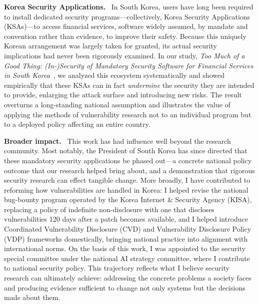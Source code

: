 \documentclass[10pt,letterpaper]{article}
\newcommand{\PP}[1]{\par\smallskip\noindent\textbf{#1.}\ }
\begin{document}
\PP{Korea Security Applications} In South Korea, users have long been required to
install dedicated security programs---collectively, Korea Security Applications
(KSAs)---to access financial services, software widely assumed, by mandate and
convention rather than evidence, to improve their safety. Because this uniquely
Korean arrangement was largely taken for granted, its actual security
implications had never been rigorously examined. In our study, \emph{Too Much of a
Good Thing: (In-)Security of Mandatory Security Software for Financial Services in
South Korea}~\cite{yun:ksa}, we analyzed this ecosystem systematically and showed
empirically that these KSAs can in fact \emph{undermine} the security they are
intended to provide, enlarging the attack surface and introducing new risks. The result overturns a long-standing national
assumption and illustrates the value of applying the methods of vulnerability
research not to an individual program but to a deployed policy affecting an entire
country.

\PP{Broader impact} This work has had influence well beyond the research
community. Most notably, the President of South Korea has since directed that
these mandatory security applications be phased out---a concrete national policy
outcome that our research helped bring about, and a demonstration that rigorous
security research can effect tangible change. More broadly, I have contributed to
reforming how vulnerabilities are handled in Korea: I helped revise the national bug-bounty program operated by the Korea
Internet \& Security Agency (KISA), replacing a policy of indefinite
non-disclosure with one that discloses vulnerabilities 120 days after a patch
becomes available, and I helped introduce Coordinated Vulnerability Disclosure
(CVD) and Vulnerability Disclosure Policy (VDP) frameworks domestically, bringing
national practice into alignment with international norms. On the basis of this
work, I was appointed to the security special committee under the national AI
strategy committee, where I contribute to national security policy. This
trajectory reflects what I believe security research can ultimately achieve:
addressing the concrete problems a society faces and producing evidence
sufficient to change not only systems but the decisions made about them.

\printbibliography[title={References}]
\end{document}
